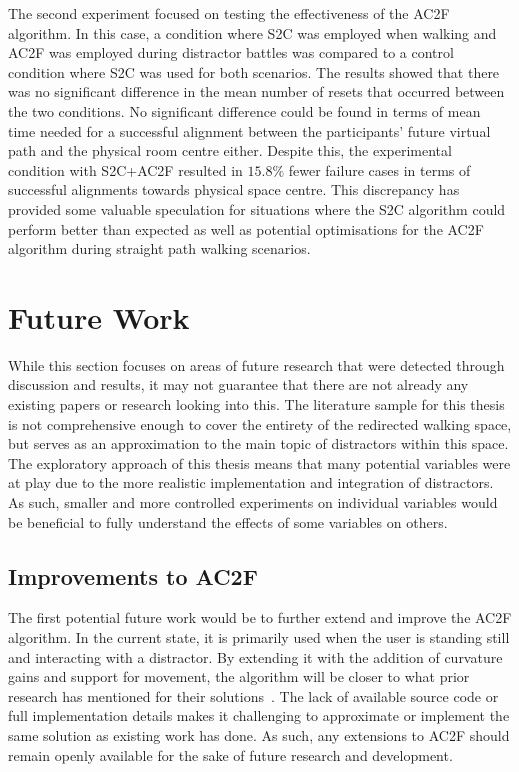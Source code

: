 The second experiment focused on testing the effectiveness of the AC2F algorithm. In this case, a condition where S2C was employed when walking and AC2F was employed during distractor battles was compared to a control condition where S2C was used for both scenarios. The results showed that there was no significant difference in the mean number of resets that occurred between the two conditions. No significant difference could be found in terms of mean time needed for a successful alignment between the participants' future virtual path and the physical room centre either. Despite this, the experimental condition with S2C+AC2F resulted in $15.8\%$ fewer failure cases in terms of successful alignments towards physical space centre. This discrepancy has provided some valuable speculation for situations where the S2C algorithm could perform better than expected as well as potential optimisations for the AC2F algorithm during straight path walking scenarios. 

\iffalse
   * This has provided insights for more predictive algorithms that it may not always be ideal to align towards centre. Depends whether they switch between algorithms or not though
\fi

\section{Future Work}\label{sec:futurework}
While this section focuses on areas of future research that were detected through discussion and results, it may not guarantee that there are not already any existing papers or research looking into this. The literature sample for this thesis is not comprehensive enough to cover the entirety of the redirected walking space, but serves as an approximation to the main topic of distractors within this space. The exploratory approach of this thesis means that many potential variables were at play due to the more realistic implementation and integration of distractors. As such, smaller and more controlled experiments on individual variables would be beneficial to fully understand the effects of some variables on others.

\subsection{Improvements to AC2F}
The first potential future work would be to further extend and improve the AC2F algorithm. In the current state, it is primarily used when the user is standing still and interacting with a distractor. By extending it with the addition of curvature gains and support for movement, the algorithm will be closer to what prior research has mentioned for their solutions~\cite{peck2010improved, chen2017towards, chen2017supporting}. The lack of available source code or full implementation details makes it challenging to approximate or implement the same solution as existing work has done. As such, any extensions to AC2F should remain openly available for the sake of future research and development. 


